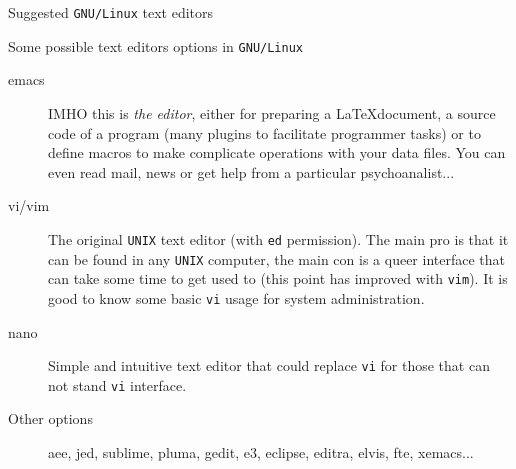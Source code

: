 \begin{frame}{Suggested \texttt{GNU/Linux} text editors}
  
  \begin{block}{Some possible text editors options in \texttt{GNU/Linux}}
    
    {\small
      \begin{description}
      \item[emacs] {\footnotesize IMHO this is \emph{the editor}, either for
          preparing a \LaTeX document, a source code of a program (many
          plugins to facilitate programmer tasks) or to define macros to
          make complicate operations with your data files. You can even read
          mail, news or get help from a particular psychoanalist...}
      \item[vi/vim] {\footnotesize The original \texttt{UNIX} text editor (with \texttt{ed} permission). The main pro is that it can be found in any \texttt{UNIX} computer, the main con is a queer interface that can take some time to get used to (this point has improved with \texttt{vim}). It is good to know some basic \texttt{vi} usage for system administration.}
      \item[nano] {\footnotesize Simple and intuitive text editor that could replace \texttt{vi} for those that can not stand \texttt{vi} interface.}

      \item[Other options] {\footnotesize aee, jed, sublime, pluma, gedit, e3, eclipse, editra, elvis, fte, xemacs...} 
      \end{description}
     }
  \end{block}
\end{frame}
